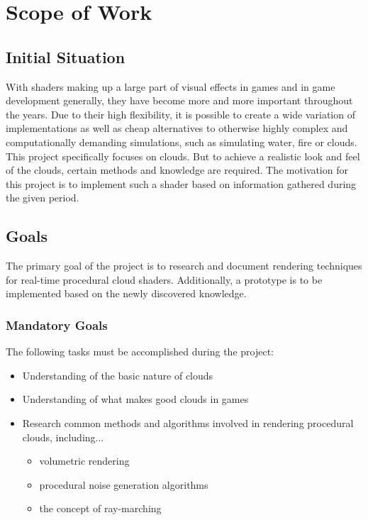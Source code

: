 \section{Scope of Work}

\subsection{Initial Situation}
With shaders making up a large part of visual effects in games and in game development generally, they have become more and more important throughout the years. Due to their high flexibility, it is possible to create a wide variation of implementations as well as cheap alternatives to otherwise highly complex and computationally demanding simulations, such as simulating water, fire or clouds.
\\ This project specifically focuses on clouds. But to achieve a realistic look and feel of the clouds, certain methods and knowledge are required. The motivation for this project is to implement such a shader based on information gathered during the given period.


\subsection{Goals}
The primary goal of the project is to research and document rendering techniques for real-time procedural cloud shaders. Additionally, a prototype is to be implemented based on the newly discovered knowledge.

\subsubsection{Mandatory Goals}
The following tasks must be accomplished during the project:
\begin{itemize}
\item Understanding of the basic nature of clouds
\item Understanding of what makes good clouds in games
\item Research common methods and algorithms involved in rendering procedural clouds, including...
    \begin{itemize}
    \item volumetric rendering
    \item procedural noise generation algorithms
    \item the concept of ray-marching
    \end{itemize}
\end{itemize}

